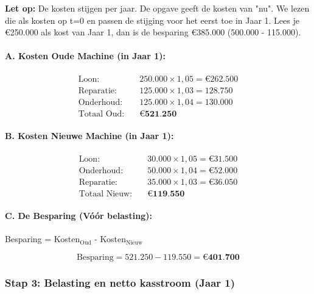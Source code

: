 \documentclass[a4paper,11pt]{article}
\begin{document}
\begin{oefenblok}
    \textbf{Let op:} De kosten stijgen per jaar. De opgave geeft de kosten van "nu". We lezen die als kosten op t=0 en passen de stijging voor het eerst toe in Jaar 1. Lees je €250.000 als kost van Jaar 1, dan is de besparing €385.000 (500.000 - 115.000).

    \paragraph{A. Kosten Oude Machine (in Jaar 1):}
    \begin{align*}
        \text{Loon:} \quad       & 250.000 \times 1{,}05 = €262.500 \\
        \text{Reparatie:} \quad  & 125.000 \times 1{,}03 = 128.750  \\
        \text{Onderhoud:} \quad  & 125.000 \times 1{,}04 = 130.000  \\
        \hline
        \text{Totaal Oud:} \quad & \textbf{€521.250}
    \end{align*}

    \paragraph{B. Kosten Nieuwe Machine (in Jaar 1):}
    \begin{align*}
        \text{Loon:} \quad         & 30.000 \times 1{,}05 = €31.500 \\
        \text{Onderhoud:} \quad    & 50.000 \times 1{,}04 = €52.000 \\
        \text{Reparatie:} \quad    & 35.000 \times 1{,}03 = €36.050 \\
        \hline
        \text{Totaal Nieuw:} \quad & \textbf{€119.550}
    \end{align*}

    \paragraph{C. De Besparing (Vóór belasting):}

    Besparing = Kosten$_{\text{Oud}}$ - Kosten$_{\text{Nieuw}}$

    \[
        \text{Besparing} = 521.250 - 119.550 = \textbf{€401.700}
    \]

    \subsubsection*{Stap 3: Belasting en netto kasstroom (Jaar 1)}


\end{oefenblok}
\end{document}
